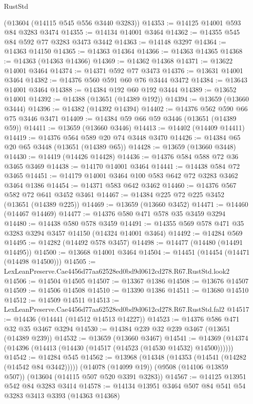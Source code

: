 \begin{lexlean}{RustStd}
\begin{coremodule}
    (@13604 (@14115 @545 @556 @3440 @3283))
@14353 := @14125 @14001 @593 @84 @3283 @3474
@14355 := @14134 @14001 @3464
@14362 := @14355 @545 @84 @592 @77 @3283 @3473 @3442
@14363 := @14148 @3297
@14364 := @14363 @14150
@14365 := @14363 @14364
@14366 := @14363 @14365
@14368 := @14363 (@14363 @14366)
@14369 := @14362 @14368
@14371 := @13622 @14001 @3464
@14374 := @14371 @592 @77 @3473
@14376 := @13631 @14001 @3464
@14382 := @14376 @560 @591 @60 @76 @3444 @3472
@14384 := @13643 @14001 @3464
@14388 := @14384 @192 @60 @192 @3444
@14389 := @13652 @14001
@14392 := @14388 (@13651 (@14389 @192))
@14394 := @13659 (@13660 @3444)
@14396 := @14382 (@14392 @14394)
@14402 := @14376 @562 @590 @66 @75 @3446 @3471
@14409 := @14384 @59 @66 @59 @3446 (@13651 (@14389 @59))
@14411 := @13659 (@13660 @3446)
@14413 := @14402 (@14409 @14411)
@14419 := @14376 @564 @589 @20 @74 @3448 @3470
@14426 := @14384 @65 @20 @65 @3448 (@13651 (@14389 @65))
@14428 := @13659 (@13660 @3448)
@14430 := @14419 (@14426 @14428)
@14436 := @14376 @584 @588 @72 @36 @3465 @3469
@14438 := @14170 @14001 @3464
@14441 := @14438 @584 @72 @3465
@14451 := @14179 @14001 @3464 @100 @583 @642 @72 @3283 @3462 @3464 @1386
@14454 := @14371 @583 @642 @3462
@14460 := @14376 @567 @582 @72 @641 @3452 @3461
@14467 := @14384 @225 @72 @225 @3452 (@13651 (@14389 @225))
@14469 := @13659 (@13660 @3452)
@14471 := @14460 (@14467 @14469)
@14477 := @14376 @580 @471 @578 @35 @3459 @3294
@14480 := @14438 @580 @578 @3459
@14491 := @14355 @569 @578 @471 @35 @3283 @3294 @3457 @14150 (@14324 @14001 @3464)
@14492 := @14284 @569
@14495 := @14282 (@14492 @578 @3457)
@14498 := @14477 (@14480 (@14491 @14495))
@14500 := @13668 @14001 @3464
@14504 := @14451 (@14454 (@14471 (@14498 @14500)))
@14505 := LexLeanPreserve.Cae4456d77aa62528ed0bd9d0612cd278.R67.RustStd.look2
@14506 := @14504 @14505
@14507 := @13367 @1386
@14508 := @13676 @14507
@14509 := @14506 @14508
@14510 := @13390 @1386
@14511 := @13680 @14510
@14512 := @14509 @14511
@14513 := LexLeanPreserve.Cae4456d77aa62528ed0bd9d0612cd278.R67.RustStd.fal2
@14517 := @14436 (@14441 (@14512 @14513 @14227))
@14523 := @14376 @586 @471 @32 @35 @3467 @3294
@14530 := @14384 @239 @32 @239 @3467 (@13651 (@14389 @239))
@14532 := @13659 (@13660 @3467)
@14541 := @14369 (@14374 (@14396 (@14413 (@14430 (@14517 (@14523 (@14530 @14532) @14500))))))
@14542 := @14284 @545
@14562 := @13968
    (@14348 (@14353 (@14541 (@14282 (@14542 @84 @3442)))))
    (@14078 (@14099 @19))
    (@9508 (@14106 @13859 @507))
    (@13604 (@14115 @507 @520 @3391 @3283))
@14567 := @14125 @13951 @542 @84 @3283 @3414
@14578 := @14134 @13951 @3464 @507 @84 @541 @54 @3283 @3413 @3393 (@14363 @14368)

\end{coremodule}
\end{lexlean}
